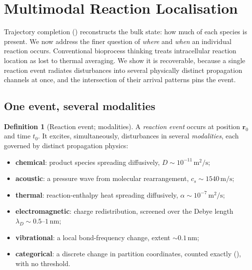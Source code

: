 \documentclass[11pt,twocolumn,a4paper]{article}
\theoremstyle{thmstyle}
\theoremstyle{definition}
\newtheorem{definition}[theorem]{Definition}
\theoremstyle{remark}
\begin{document}
\section{Multimodal Reaction Localisation}
\label{sec:localisation}

Trajectory completion () reconstructs the bulk state:
how much of each species is present. We now address the finer question of
\emph{where} and \emph{when} an individual reaction occurs. Conventional
bioprocess thinking treats intracellular reaction location as lost to
thermal averaging. We show it is recoverable, because a single reaction
event radiates disturbances into several physically distinct propagation
channels at once, and the intersection of their arrival patterns pins the
event.

\subsection{One event, several modalities}

\begin{definition}[Reaction event; modalities]
\label{def:event}
A \emph{reaction event} occurs at position $\mathbf{r}_0$ and time $t_0$. It
excites, simultaneously, disturbances in several \emph{modalities}, each
governed by distinct propagation physics:
\begin{itemize}[leftmargin=1.4em,nosep]
\item \textbf{chemical}: product species spreading diffusively,
$D\sim10^{-11}\,\mathrm{m}^2/\mathrm{s}$;
\item \textbf{acoustic}: a pressure wave from molecular rearrangement,
$c_s\sim1540\,\mathrm{m/s}$;
\item \textbf{thermal}: reaction-enthalpy heat spreading diffusively,
$\alpha\sim10^{-7}\,\mathrm{m}^2/\mathrm{s}$;
\item \textbf{electromagnetic}: charge redistribution, screened over the
Debye length $\lambda_D\sim0.5$--$1\,\mathrm{nm}$;
\item \textbf{vibrational}: a local bond-frequency change, extent
$\sim0.1\,\mathrm{nm}$;
\item \textbf{categorical}: a discrete change in partition coordinates,
counted exactly (), with no threshold.
\end{itemize}
\end{definition}
\end{document}
